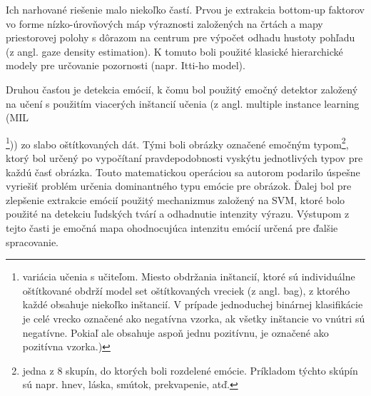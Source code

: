 Ich narhované riešenie malo niekoľko častí. Prvou je extrakcia bottom-up faktorov vo forme nízko-úrovňových 
máp výraznosti založených na črtách a mapy priestorovej polohy s dôrazom na centrum pre výpočet odhadu hustoty pohľadu (z angl. gaze density estimation). K tomuto boli použité klasické hierarchické modely pre určovanie pozornosti (napr. Itti-ho model).

Druhou časťou je detekcia emócií, k čomu bol použitý emočný detektor založený na učení s použitím viacerých inštancií učenia (z angl. multiple instance learning (MIL

\footnote{variácia učenia s učiteľom. Miesto obdržania inštancií, ktoré sú individuálne oštítkované obdrží model set oštítkovaných vreciek (z angl. bag), z ktorého každé obsahuje niekoľko inštancií. V prípade jednoduchej binárnej klasifikácie je celé vrecko označené ako negatívna vzorka, ak všetky inštancie vo vnútri sú negatívne. Pokiaľ ale obsahuje aspoň jednu pozitívnu, je označené ako pozitívna vzorka.)})) zo slabo oštítkovaných dát. Tými boli obrázky označené emočným typom\footnote{jedna z 8 skupín, do ktorých boli rozdelené emócie. Príkladom týchto skúpín sú napr. hnev, láska, smútok, prekvapenie, atď.}, ktorý bol určený po vypočítaní pravdepodobnosti vyskýtu jednotlivých typov pre každú časť obrázka. Touto matematickou operáciou sa autorom podarilo úspešne vyriešiť problém určenia dominantného typu emócie pre obrázok.  Ďalej bol pre zlepšenie extrakcie emócií použitý mechanizmus založený na SVM, ktoré bolo použité na detekciu ľudských tvárí a odhadnutie intenzity výrazu. Výstupom z tejto časti je emočná mapa ohodnocujúca intenzitu emócií určená pre ďalšie spracovanie.

